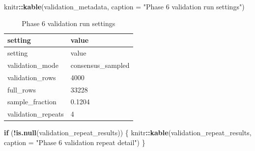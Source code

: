 \documentclass[
]{article}
\newenvironment{Shaded}{\begin{snugshade}}{\end{snugshade}}
\newcommand{\AttributeTok}[1]{\textcolor[rgb]{0.13,0.29,0.53}{#1}}
\newcommand{\ControlFlowTok}[1]{\textcolor[rgb]{0.13,0.29,0.53}{\textbf{#1}}}
\newcommand{\FunctionTok}[1]{\textcolor[rgb]{0.13,0.29,0.53}{\textbf{#1}}}
\newcommand{\NormalTok}[1]{#1}
\newcommand{\SpecialCharTok}[1]{\textcolor[rgb]{0.81,0.36,0.00}{\textbf{#1}}}
\newcommand{\StringTok}[1]{\textcolor[rgb]{0.31,0.60,0.02}{#1}}
\begin{document}
\begin{Shaded}
\begin{Highlighting}[]
\NormalTok{knitr}\SpecialCharTok{::}\FunctionTok{kable}\NormalTok{(validation\_metadata, }\AttributeTok{caption =} \StringTok{"Phase 6 validation run settings"}\NormalTok{)}
\end{Highlighting}
\end{Shaded}

\begin{longtable}[]{@{}ll@{}}
\caption{Phase 6 validation run settings}\tabularnewline
\toprule\noalign{}
setting & value \\
\midrule\noalign{}
\endfirsthead
\toprule\noalign{}
setting & value \\
\midrule\noalign{}
\endhead
\bottomrule\noalign{}
\endlastfoot
validation\_mode & consensus\_sampled \\
validation\_rows & 4000 \\
full\_rows & 33228 \\
sample\_fraction & 0.1204 \\
validation\_repeats & 4 \\
\end{longtable}

\begin{Shaded}
\begin{Highlighting}[]
\ControlFlowTok{if}\NormalTok{ (}\SpecialCharTok{!}\FunctionTok{is.null}\NormalTok{(validation\_repeat\_results)) \{}
\NormalTok{  knitr}\SpecialCharTok{::}\FunctionTok{kable}\NormalTok{(validation\_repeat\_results, }\AttributeTok{caption =} \StringTok{"Phase 6 validation repeat detail"}\NormalTok{)}
\NormalTok{\}}
\end{Highlighting}
\end{Shaded}
\end{document}

